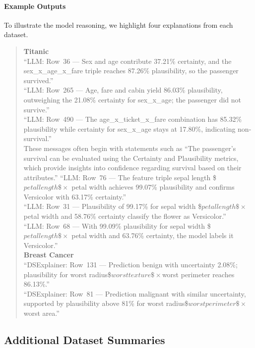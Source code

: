 \documentclass[acmlarge]{acmart}
\begin{document}
\paragraph{Example Outputs}
To illustrate the model reasoning, we highlight four explanations from each dataset.
\begin{quote}
\textbf{Titanic}\\

``LLM: Row~36 --- Sex and age contribute 37.21\% certainty, and the sex\_x\_age\_x\_fare triple reaches 87.26\% plausibility, so the passenger survived.''\\
``LLM: Row~265 --- Age, fare and cabin yield 86.03\% plausibility, outweighing the 21.08\% certainty for sex\_x\_age; the passenger did not survive.''\\
``LLM: Row~490 --- The age\_x\_ticket\_x\_fare combination has 85.32\% plausibility while certainty for sex\_x\_age stays at 17.80\%, indicating non-survival.''\\
These messages often begin with statements such as ``The passenger's survival can be evaluated using the Certainty and Plausibility metrics, which provide insights into confidence regarding survival based on their attributes.''
``LLM: Row~76 --- The feature triple sepal length \$\times$ petal length \$\times$ petal width achieves 99.07\% plausibility and confirms Versicolor with 63.17\% certainty.''\\
``LLM: Row~31 --- Plausibility of 99.17\% for sepal width \$\times$ petal length \$\times$ petal width and 58.76\% certainty classify the flower as Versicolor.''\\
``LLM: Row~68 --- With 99.09\% plausibility for sepal width \$\times$ petal length \$\times$ petal width and 63.76\% certainty, the model labels it Versicolor.''\\
\textbf{Breast Cancer}\\
``DSExplainer: Row~131 --- Prediction benign with uncertainty 2.08\%; plausibility for worst radius\$\times$worst texture\$\times$worst perimeter reaches 86.13\%.''\\
``DSExplainer: Row~81 --- Prediction malignant with similar uncertainty, supported by plausibility above 81\% for worst radius\$\times$worst perimeter\$\times$worst area.''\\
\end{quote}
\subsection{Additional Dataset Summaries}
\label{sec:additional_datasets}
\end{document}
